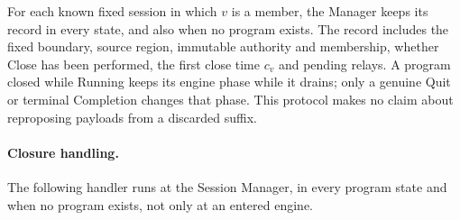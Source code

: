 \documentclass[11pt,a4paper]{article}
\newcounter{protocol}
\begin{document}
For each known fixed session in which $v$ is a member, the Manager keeps
its record in every state, and also when no program exists. The record
includes the fixed boundary, source region, immutable authority and
membership, whether Close has been performed, the first close time $c_v$
and pending relays. A program closed while Running keeps its engine
phase while it drains; only a genuine Quit or terminal Completion
changes that phase. This protocol makes no claim about reproposing
payloads from a discarded suffix.

\paragraph{Closure handling.}
The following handler runs at the Session Manager, in every program
state and when no program exists, not only at an entered engine.
\end{document}
